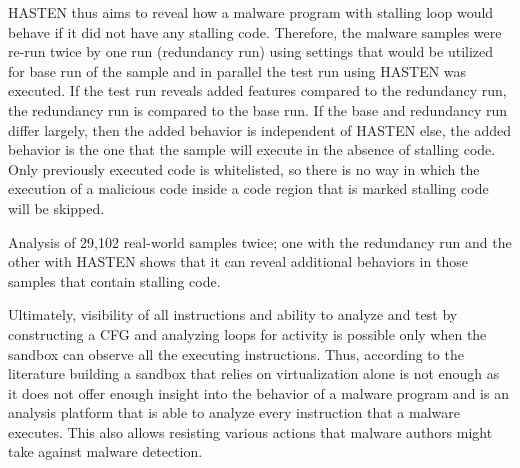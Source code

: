 \documentclass[11pt]{article}
\begin{document}
		HASTEN thus aims to reveal how a malware program with stalling loop would behave if it did not have any stalling code. Therefore, the malware samples were re-run twice by one run (redundancy run) using settings that would be utilized for base run of the sample and in parallel the test run using HASTEN was executed. If the test run reveals added features compared to the redundancy run, the redundancy run is compared to the base run. If the base and redundancy run differ largely, then the added behavior is independent of HASTEN else, the added behavior is the one that the sample will execute in the absence of stalling code. Only previously executed code is whitelisted, so there is no way in which the execution of a malicious code inside a code region that is marked stalling code will be skipped. 

		Analysis of 29,102 real-world samples twice; one with the redundancy run and the other with HASTEN shows that it can reveal additional behaviors in those samples that contain stalling code. 

		Ultimately, visibility of all instructions and ability to analyze and test by constructing a CFG and analyzing loops for activity is possible only when the sandbox can observe all the executing instructions. Thus, according to the literature building a sandbox that relies on virtualization alone is not enough as it does not offer enough insight into the behavior of a malware program and is an analysis platform that is able to analyze every instruction that a malware executes. This also allows resisting various actions that malware authors might take against malware detection.
		
\end{document}
